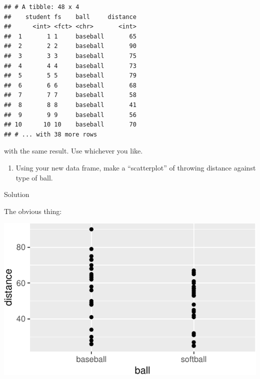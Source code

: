 \documentclass[]{tufte-book}
\newenvironment{Shaded}{}{}
\newcommand{\DataTypeTok}[1]{\textcolor[rgb]{0.56,0.13,0.00}{#1}}
\newcommand{\KeywordTok}[1]{\textcolor[rgb]{0.00,0.44,0.13}{\textbf{#1}}}
\newcommand{\NormalTok}[1]{#1}
\newcommand{\OperatorTok}[1]{\textcolor[rgb]{0.40,0.40,0.40}{#1}}
\newcommand{\StringTok}[1]{\textcolor[rgb]{0.25,0.44,0.63}{#1}}
\providecommand{\tightlist}{%
  \setlength{\itemsep}{0pt}\setlength{\parskip}{0pt}}
\theoremstyle{definition}
\theoremstyle{definition}
\theoremstyle{definition}
\theoremstyle{remark}
\begin{document}
\begin{verbatim}
## # A tibble: 48 x 4
##    student fs    ball     distance
##      <int> <fct> <chr>       <int>
##  1       1 1     baseball       65
##  2       2 2     baseball       90
##  3       3 3     baseball       75
##  4       4 4     baseball       73
##  5       5 5     baseball       79
##  6       6 6     baseball       68
##  7       7 7     baseball       58
##  8       8 8     baseball       41
##  9       9 9     baseball       56
## 10      10 10    baseball       70
## # ... with 38 more rows
\end{verbatim}

with the same result. Use whichever you like.

\begin{enumerate}
\def\labelenumi{(\alph{enumi})}
\setcounter{enumi}{3}
\tightlist
\item
  Using your new data frame, make a ``scatterplot'' of throwing distance
  against type of ball.
\end{enumerate}

Solution

The obvious thing:

\begin{Shaded}
\end{Shaded}

\includegraphics{11-tidying-and-selecting-data_files/figure-latex/unnamed-chunk-18-1}
\end{document}
